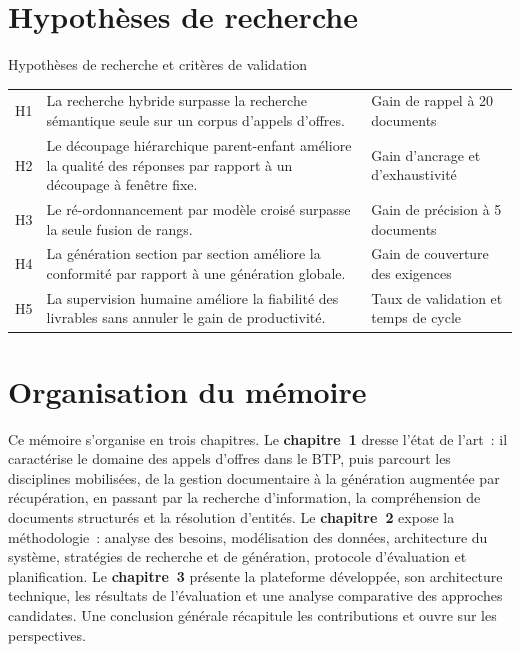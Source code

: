 \section*{Hypothèses de recherche}

\begin{btptable}{Hypothèses de recherche et critères de validation}
\begin{tabularx}{\linewidth}{@{}C{1.1cm} Y L{3.5cm}@{}}
\toprule
{}
 &  &  \\
\midrule
H1 & La recherche hybride surpasse la recherche sémantique seule sur un corpus d'appels d'offres. & Gain de rappel à 20 documents \\
H2 & Le découpage hiérarchique parent-enfant améliore la qualité des réponses par rapport à un découpage à fenêtre fixe. & Gain d'ancrage et d'exhaustivité \\
H3 & Le ré-ordonnancement par modèle croisé surpasse la seule fusion de rangs. & Gain de précision à 5 documents \\
H4 & La génération section par section améliore la conformité par rapport à une génération globale. & Gain de couverture des exigences \\
H5 & La supervision humaine améliore la fiabilité des livrables sans annuler le gain de productivité. & Taux de validation et temps de cycle \\
\bottomrule
\end{tabularx}
\end{btptable}

\section*{Organisation du mémoire}

Ce mémoire s'organise en trois chapitres. Le \textbf{chapitre~1} dresse l'état
de l'art~: il caractérise le domaine des appels d'offres dans le BTP, puis
parcourt les disciplines mobilisées, de la gestion documentaire à la génération
augmentée par récupération, en passant par la recherche d'information, la
compréhension de documents structurés et la résolution d'entités. Le
\textbf{chapitre~2} expose la méthodologie~: analyse des besoins, modélisation
des données, architecture du système, stratégies de recherche et de génération,
protocole d'évaluation et planification. Le \textbf{chapitre~3} présente la
plateforme développée, son architecture technique, les résultats de
l'évaluation et une analyse comparative des approches candidates. Une
conclusion générale récapitule les contributions et ouvre sur les perspectives.

\btpEndMark
\clearpage
